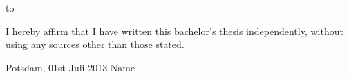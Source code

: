 \thispagestyle{empty}
\vspace*{24\baselineskip}
\hbox to \textwidth{\hrulefill}
\par
I hereby affirm that I have written this bachelor's thesis independently, without using any sources other than those stated.

Potsdam, 01st Juli 2013
\newline
\newline
\newline
\newline
\newline
Name

\clearpage